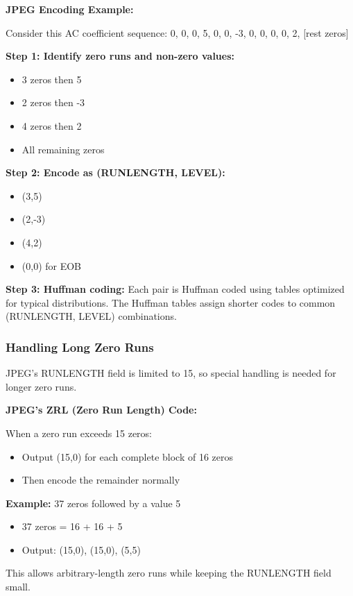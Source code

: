 \begin{examplebox}
\textbf{JPEG Encoding Example:}

Consider this AC coefficient sequence:
0, 0, 0, 5, 0, 0, -3, 0, 0, 0, 0, 2, [rest zeros]

\textbf{Step 1: Identify zero runs and non-zero values:}
\begin{itemize}
    \item 3 zeros then 5
    \item 2 zeros then -3
    \item 4 zeros then 2
    \item All remaining zeros
\end{itemize}

\textbf{Step 2: Encode as (RUNLENGTH, LEVEL):}
\begin{itemize}
    \item (3,5)
    \item (2,-3)
    \item (4,2)
    \item (0,0) for EOB
\end{itemize}

\textbf{Step 3: Huffman coding:} Each pair is Huffman coded using tables optimized for typical distributions. The Huffman tables assign shorter codes to common (RUNLENGTH, LEVEL) combinations.
\end{examplebox}

\subsubsection{Handling Long Zero Runs}

JPEG's RUNLENGTH field is limited to 15, so special handling is needed for longer zero runs.

\begin{importantbox}
\textbf{JPEG's ZRL (Zero Run Length) Code:}

When a zero run exceeds 15 zeros:
\begin{itemize}
    \item Output (15,0) for each complete block of 16 zeros
    \item Then encode the remainder normally
\end{itemize}

\textbf{Example:} 37 zeros followed by a value 5
\begin{itemize}
    \item 37 zeros = 16 + 16 + 5
    \item Output: (15,0), (15,0), (5,5)
\end{itemize}

This allows arbitrary-length zero runs while keeping the RUNLENGTH field small.
\end{importantbox}

